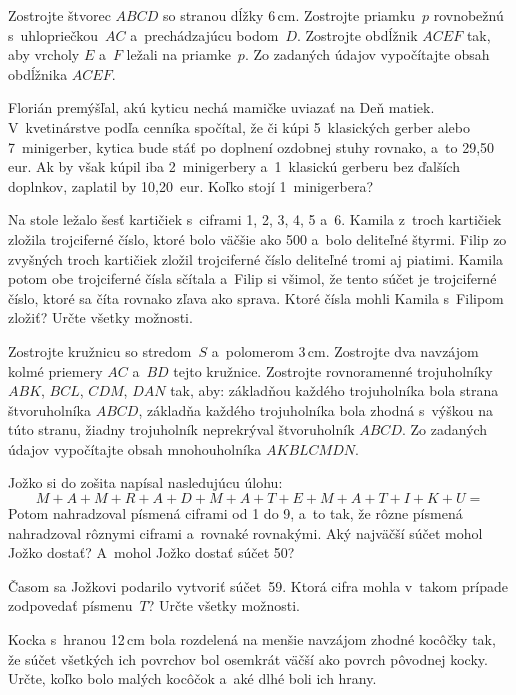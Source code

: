 {%
Zostrojte štvorec $ABCD$ so stranou dĺžky 6\,cm. Zostrojte priamku~$p$ rovnobežnú s~uhlopriečkou~$AC$ a~prechádzajúcu bodom~$D$. Zostrojte obdĺžnik $ACEF$ tak, aby vrcholy $E$ a~$F$ ležali na priamke~$p$. Zo zadaných údajov vypočítajte obsah obdĺžnika $ACEF$.}

{%
Florián premýšľal, akú kyticu nechá mamičke uviazať na Deň matiek. V~kvetinárstve podľa cenníka spočítal, že či kúpi 5~klasických gerber alebo 7~minigerber, kytica bude stáť po doplnení ozdobnej stuhy rovnako, a~to 29,50 eur. Ak by však kúpil iba 2~minigerbery a~1~klasickú gerberu bez ďalších doplnkov, zaplatil by 10,20~eur. Koľko stojí 1~minigerbera?}

{%
Na stole ležalo šesť kartičiek s~ciframi 1, 2, 3, 4, 5 a~6. Kamila z~troch kartičiek zložila trojciferné číslo, ktoré bolo väčšie ako 500 a~bolo deliteľné štyrmi. Filip zo zvyšných troch kartičiek zložil trojciferné číslo deliteľné tromi aj piatimi. Kamila potom obe trojciferné čísla sčítala a~Filip si všimol, že tento súčet je trojciferné číslo, ktoré sa číta rovnako zľava ako sprava. Ktoré čísla mohli Kamila s~Filipom zložiť? Určte všetky možnosti.}

{%
Zostrojte kružnicu so stredom~$S$ a~polomerom 3\,cm. Zostrojte dva navzájom kolmé priemery $AC$ a~$BD$ tejto kružnice. Zostrojte rovnoramenné trojuholníky $ABK$, $BCL$, $CDM$, $DAN$ tak, aby:
\itemitem{$\bullet$} základňou každého trojuholníka bola strana štvoruholníka $ABCD$,
\itemitem{$\bullet$} základňa každého trojuholníka bola zhodná s~výškou na túto stranu,
\itemitem{$\bullet$} žiadny trojuholník neprekrýval štvoruholník $ABCD$.
\endgraf\noindent
Zo zadaných údajov vypočítajte obsah mnohouholníka $AKBLCMDN$.}

{%
Jožko si do zošita napísal nasledujúcu úlohu:
$$
M+A+M+R+A+D+M+A+T+E+M+A+T+I+K+U=
$$
Potom nahradzoval písmená ciframi od 1 do 9, a~to tak, že rôzne písmená nahradzoval rôznymi ciframi a~rovnaké rovnakými. Aký najväčší súčet mohol Jožko dostať? A~mohol Jožko dostať súčet 50?

Časom sa Jožkovi podarilo vytvoriť súčet~59. Ktorá cifra mohla v~takom prípade zodpovedať písmenu~$T$? Určte všetky možnosti.
}

{%
Kocka s~hranou 12\,cm bola rozdelená na menšie navzájom zhodné kocôčky tak, že súčet všetkých ich povrchov bol osemkrát väčší ako povrch pôvodnej kocky. Určte, koľko bolo malých kocôčok a~aké dlhé boli ich hrany.}

